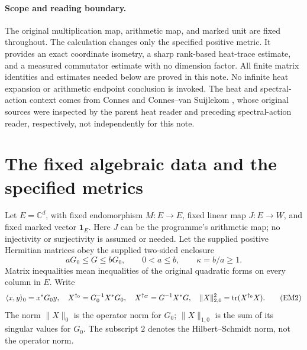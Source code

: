 \documentclass[11pt]{article}
\begin{document}
\paragraph{Scope and reading boundary.}
The original multiplication map, arithmetic map, and marked unit are fixed
throughout. The calculation changes only the specified positive metric.
It provides an exact coordinate isometry, a sharp rank-based heat-trace
estimate, and a measured commutator estimate with no dimension factor.
All finite matrix identities and estimates needed below are proved in this
note. No infinite heat expansion or arithmetic endpoint conclusion is
invoked. The heat and spectral-action context comes from Connes
\cite{hem:ConnesHeat} and Connes--van Suijlekom \cite{hem:ConnesSuijlekom}, whose
original sources were inspected by the parent heat reader and preceding
spectral-action reader, respectively, not independently for this note.

\section{The fixed algebraic data and the specified metrics}

Let \(E=\mathbb C^d\), with fixed endomorphism \(M:E\to E\), fixed linear
map \(J:E\to W\), and fixed marked vector \(\mathbf1_E\).
Here \(J\) can be the programme's arithmetic map; no injectivity or
surjectivity is assumed or needed. Let the supplied positive Hermitian
matrices obey the supplied two-sided enclosure
\begin{equation}
 aG_0\le G\le bG_0,\qquad 0<a\le b,\qquad \kappa=b/a\ge1.
 \tag{EM1}\label{hem:EM1}
\end{equation}
Matrix inequalities mean inequalities of the original quadratic forms
on every column in \(E\). Write
\begin{equation}
 \langle x,y\rangle_0=x^*G_0y,\quad
 X^{\dagger_0}=G_0^{-1}X^*G_0,\quad
 X^{\dagger_G}=G^{-1}X^*G,\quad
 \|X\|_{2,0}^2=\operatorname{tr}(X^{\dagger_0}X).
 \tag{EM2}\label{hem:EM2}
\end{equation}
The norm \(\|X\|_0\) is the operator norm for \(G_0\);
\(\|X\|_{1,0}\) is the sum of its singular values for \(G_0\).
The subscript \(2\) denotes the Hilbert--Schmidt norm, not the operator norm.
\end{document}

